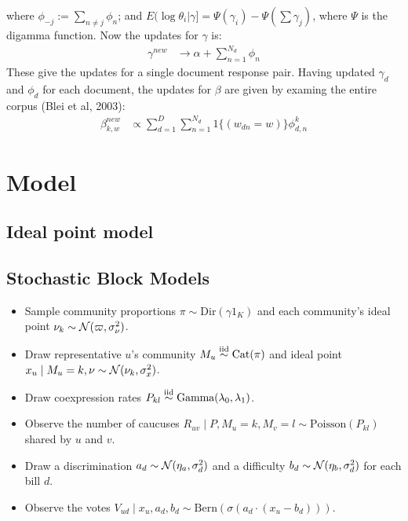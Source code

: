 \documentclass{article}
\begin{document}
where $\phi_{-j} := \sum_{n\not=j} \phi_n$; and $E(\log \theta_i | \gamma] = \Psi(\gamma_i) - \Psi(\sum \gamma_j)$, where $\Psi$ is the digamma function. Now the updates for $\gamma$ is: 
\begin{align*}
\gamma^{new} &\rightarrow \alpha + \sum_{n=1}^{N_d} \phi_n 
\end{align*}
These give the updates for a single document response pair. Having updated $\gamma_d$ and $\phi_d$ for each document, the updates for $\beta$ are given by examing the entire corpus (Blei et al, 2003): 
\begin{align*}
\beta^{new}_{k,w} &\propto \sum_{d=1}^D \sum_{n=1}^{N_d} 1\{(w_{dn} = w)\} \phi^k_{d,n}
\end{align*}


\newpage 

\section{Model}

\subsection{Ideal point model}

\subsection{Stochastic Block Models} 


\newpage



\begin{itemize}
\item Sample community proportions $\pi \sim \text{Dir}(\gamma 1_K)$ and each community's ideal point $\nu_k\sim \mathcal{N}(\varpi, \sigma^2_\nu)$.
\item Draw representative $u$'s community $M_u\stackrel{\tiny\text{iid}}{\sim} \text{Cat}(\pi)$ and ideal point $x_u\mid M_u = k, \nu \sim \mathcal{N}(\nu_k,\sigma^2_x)$.
\item Draw coexpression rates $P_{kl} \stackrel{\tiny\text{iid}}{\sim} \text{Gamma}(\lambda_0,\lambda_1)$.
\item Observe the number of caucuses $R_{uv} \mid P, M_u=k, M_v=l\sim \text{Poisson}(P_{kl})$ shared by $u$ and $v$.
\item Draw a discrimination $a_d \sim \mathcal{N}(\eta_{a},\sigma^2_d)$ and a difficulty $b_d \sim \mathcal{N}(\eta_{b},\sigma^2_d)$ for each bill $d$.
\item Observe the votes $V_{ud} \mid x_u, a_d, b_d \sim \text{Bern}(\sigma(a_d\cdot(x_u-b_d)))$.
\end{itemize}
\end{document}
